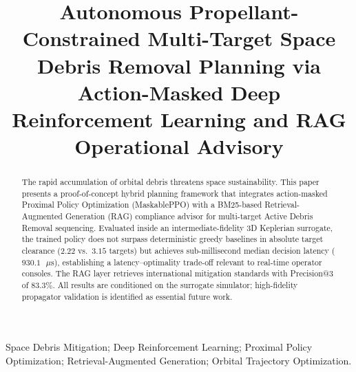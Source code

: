 \documentclass[10pt,conference,a4paper]{IEEEtran}
\begin{document}
\sloppy
\thispagestyle{empty}
\pagestyle{empty}

\title{Autonomous Propellant-Constrained Multi-Target Space Debris Removal Planning via Action-Masked Deep Reinforcement Learning and RAG Operational Advisory}

\author{
\and
{}
\and
{}
}

\maketitle

\begin{abstract}
The rapid accumulation of orbital debris threatens space sustainability. This paper presents a proof-of-concept hybrid planning framework that integrates action-masked Proximal Policy Optimization (MaskablePPO) with a BM25-based Retrieval-Augmented Generation (RAG) compliance advisor for multi-target Active Debris Removal sequencing. Evaluated inside an intermediate-fidelity 3D Keplerian surrogate, the trained policy does not surpass deterministic greedy baselines in absolute target clearance ($2.22$ vs.\ $3.15$ targets) but achieves sub-millisecond median decision latency ($930.1\text{ }\mu\text{s}$), establishing a latency--optimality trade-off relevant to real-time operator consoles. The RAG layer retrieves international mitigation standards with Precision@3 of $83.3\%$. All results are conditioned on the surrogate simulator; high-fidelity propagator validation is identified as essential future work.
\end{abstract}

\begin{IEEEkeywords}
Space Debris Mitigation; Deep Reinforcement Learning; Proximal Policy Optimization; Retrieval-Augmented Generation; Orbital Trajectory Optimization.
\end{IEEEkeywords}
\end{document}
